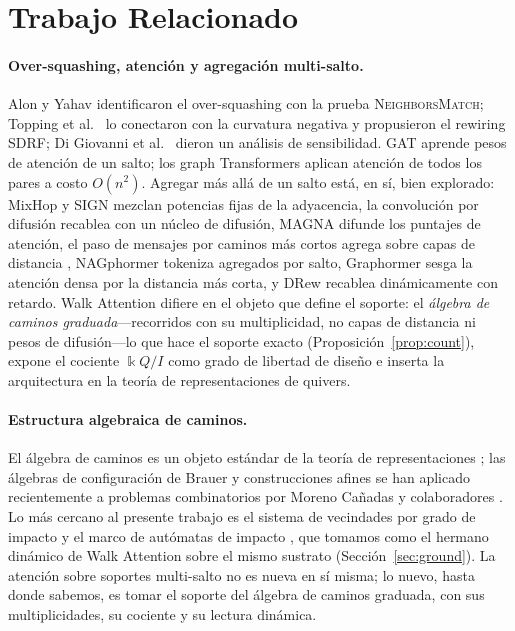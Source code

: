 \documentclass[runningheads]{llncs}
\newcommand{\kk}{\Bbbk}
\newcommand{\kQ}{\kk Q}
\begin{document}
\section{Trabajo Relacionado}\label{sec:related}

\paragraph{Over-squashing, atención y agregación multi-salto.}
Alon y Yahav \cite{alon2021bottleneck} identificaron el over-squashing con la
prueba \textsc{NeighborsMatch}; Topping et al.\ \cite{topping2022understanding}
lo conectaron con la curvatura negativa y propusieron el rewiring SDRF; Di
Giovanni et al.\ \cite{digiovanni2023oversquashing} dieron un análisis de
sensibilidad.
GAT \cite{velickovic2017graph} aprende pesos de atención de un salto; los graph
Transformers aplican atención de todos los pares \cite{vaswani2017attention} a
costo $O(n^2)$.
Agregar más allá de un salto está, en sí, bien explorado: MixHop
\cite{abu2019mixhop} y SIGN \cite{frasca2020sign} mezclan potencias fijas de la
adyacencia, la convolución por difusión \cite{gasteiger2019diffusion} recablea
con un núcleo de difusión, MAGNA \cite{wang2021magna} difunde los puntajes de
atención, el paso de mensajes por caminos más cortos agrega sobre capas de
distancia \cite{abboud2022shortest}, NAGphormer \cite{chen2023nagphormer}
tokeniza agregados por salto, Graphormer \cite{ying2021graphormer} sesga la
atención densa por la distancia más corta, y DRew \cite{gutteridge2023drew}
recablea dinámicamente con retardo. Walk Attention difiere en el objeto que
define el soporte: el \emph{álgebra de caminos graduada}---recorridos con su
multiplicidad, no capas de distancia ni pesos de difusión---lo que hace el
soporte exacto (Proposición~\ref{prop:count}), expone el cociente $\kQ/I$ como
grado de libertad de diseño e inserta la arquitectura en la teoría de
representaciones de quivers.

\paragraph{Estructura algebraica de caminos.}
El álgebra de caminos es un objeto estándar de la teoría de representaciones
\cite{schiffler2014quiver,assem2006elements}; las álgebras de configuración de
Brauer y construcciones afines se han aplicado recientemente a problemas
combinatorios por Moreno Cañadas y colaboradores
\cite{moreno2021brauer,moreno2024integer}. Lo más cercano al presente trabajo
es el sistema de vecindades por grado de impacto y el marco de autómatas de
impacto \cite{zainea2026aiq,ibanez2025casimulations}, que tomamos como el
hermano dinámico de Walk Attention sobre el mismo sustrato
(Sección~\ref{sec:ground}). La atención sobre soportes multi-salto no es nueva
en sí misma; lo nuevo, hasta donde sabemos, es tomar el soporte del álgebra de
caminos graduada, con sus multiplicidades, su cociente y su lectura dinámica.
\end{document}
